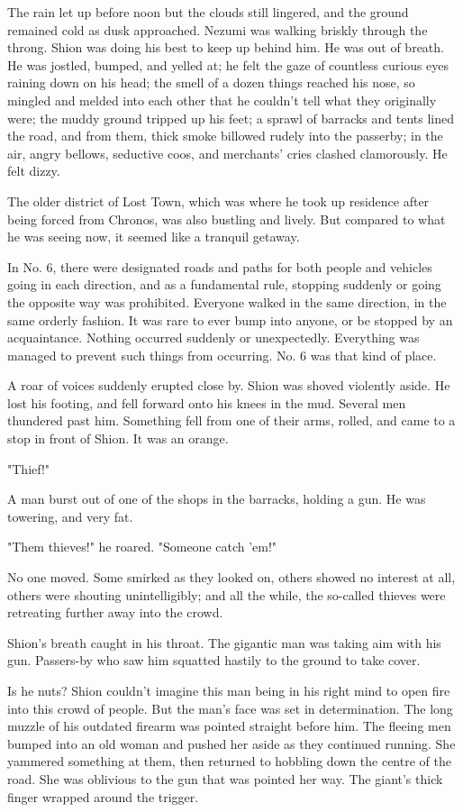 The rain let up before noon but the clouds still lingered, and the
ground remained cold as dusk approached. Nezumi was walking briskly
through the throng. Shion was doing his best to keep up behind him. He
was out of breath. He was jostled, bumped, and yelled at; he felt the
gaze of countless curious eyes raining down on his head; the smell of a
dozen things reached his nose, so mingled and melded into each other
that he couldn't tell what they originally were; the muddy ground
tripped up his feet; a sprawl of barracks and tents lined the road, and
from them, thick smoke billowed rudely into the passerby; in the air,
angry bellows, seductive coos, and merchants' cries clashed clamorously.
He felt dizzy.

The older district of Lost Town, which was where he took up residence
after being forced from Chronos, was also bustling and lively. But
compared to what he was seeing now, it seemed like a tranquil getaway.

In No. 6, there were designated roads and paths for both people and
vehicles going in each direction, and as a fundamental rule, stopping
suddenly or going the opposite way was prohibited. Everyone walked in
the same direction, in the same orderly fashion. It was rare to ever
bump into anyone, or be stopped by an acquaintance. Nothing occurred
suddenly or unexpectedly. Everything was managed to prevent such things
from occurring. No. 6 was that kind of place.

A roar of voices suddenly erupted close by. Shion was shoved violently
aside. He lost his footing, and fell forward onto his knees in the mud.
Several men thundered past him. Something fell from one of their arms,
rolled, and came to a stop in front of Shion. It was an orange.

"Thief!"

A man burst out of one of the shops in the barracks, holding a gun. He
was towering, and very fat.

"Them thieves!" he roared. "Someone catch 'em!"

No one moved. Some smirked as they looked on, others showed no interest
at all, others were shouting unintelligibly; and all the while, the
so-called thieves were retreating further away into the crowd.

Shion's breath caught in his throat. The gigantic man was taking aim
with his gun. Passers-by who saw him squatted hastily to the ground to
take cover.

Is he nuts? Shion couldn't imagine this man being in his right mind to
open fire into this crowd of people. But the man's face was set in
determination. The long muzzle of his outdated firearm was pointed
straight before him. The fleeing men bumped into an old woman and pushed
her aside as they continued running. She yammered something at them,
then returned to hobbling down the centre of the road. She was oblivious
to the gun that was pointed her way. The giant's thick finger wrapped
around the trigger.

